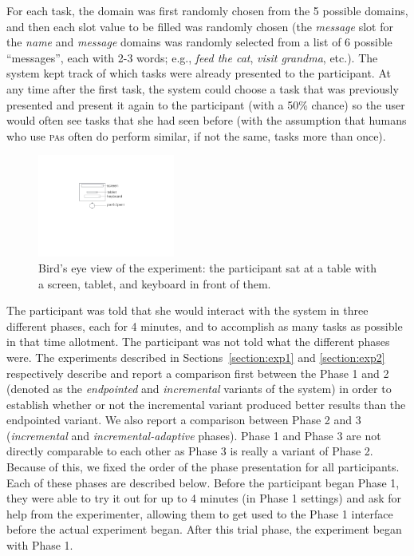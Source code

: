 \documentclass[11pt]{article}
\newcommand{\pa}[0]{\textsc{pa}}
\begin{document}

For each task, the domain was first randomly chosen from the 5 possible domains, and then each slot value to be filled was randomly chosen (the \emph{message} slot for the \emph{name} and \emph{message} domains was randomly selected from a list of 6 possible ``messages'', each with 2-3 words; e.g., \emph{feed the cat}, \emph{visit grandma}, etc.). The system kept track of which tasks were already presented to the participant. At any time after the first task, the system could choose a task that was previously presented and present it again to the participant (with a 50\% chance) so the user would often see tasks that she had seen before (with the assumption that humans who use \pa s often do perform similar, if not the same, tasks more than once). 

\begin{figure}[ht]
  \centering
      \includegraphics[width=0.4\textwidth]{figures/dataview.pdf}	
      \caption{Bird's eye view of the experiment: the participant sat at a table with a screen, tablet, and keyboard in front of them. \label{fig:dataview}}
\end{figure}

The participant was told that she would interact with the system in three different phases, each for 4 minutes, and to accomplish as many tasks as possible in that time allotment. The participant was not told what the different phases were. The experiments described in Sections~\ref{section:exp1} and \ref{section:exp2} respectively describe and report a comparison first between the Phase 1 and 2 (denoted as the \emph{endpointed} and \emph{incremental} variants of the system) in order to establish whether or not the incremental variant produced better results than the endpointed variant. We also report a comparison between Phase 2 and 3 (\emph{incremental} and \emph{incremental-adaptive} phases). Phase 1 and Phase 3 are not directly comparable to each other as Phase 3 is really a variant of Phase 2. Because of this, we fixed the order of the phase presentation for all participants. Each of these phases are described below. Before the participant began Phase 1, they were able to try it out for up to 4 minutes (in Phase 1 settings) and ask for help from the experimenter, allowing them to get used to the Phase 1 interface before the actual experiment began. After this trial phase, the experiment began with Phase 1. 
\end{document}
